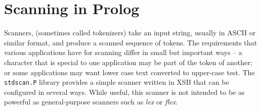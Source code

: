 \begin{description}
\end{description}

\section{Scanning in Prolog}

Scanners, (sometimes called tokenizers) take an input string, usually
in ASCII or similar format, and produce a scanned sequence of tokens.
The requirements that various applications have for scanning differ in
small but important ways -- a character that is special to one
application may be part of the token of another; or some applications
may want lower case text converted to upper-case test.  The {\tt
stdscan.P} library provides a simple scanner written in XSB that can
be configured in several ways.  While useful, this scanner is not
intended to be as powerful as general-purpose scanners such as {\em
lex} or {\em flex}.

